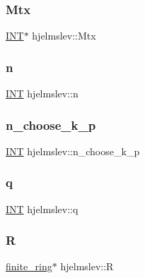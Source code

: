 \mbox{\label{classhjelmslev_aedb29614299b669317b9cb79ea6eaf1f}} 
\subsubsection{\texorpdfstring{Mtx}{Mtx}}
{\footnotesize\ttfamily \mbox{\hyperlink{galois_8h_a09fddde158a3a20bd2dcadb609de11dc}{I\+NT}}$\ast$ hjelmslev\+::\+Mtx}

\mbox{\label{classhjelmslev_a585f34e9f542a79e21b9feaa45146489}} 
\subsubsection{\texorpdfstring{n}{n}}
{\footnotesize\ttfamily \mbox{\hyperlink{galois_8h_a09fddde158a3a20bd2dcadb609de11dc}{I\+NT}} hjelmslev\+::n}

\mbox{\label{classhjelmslev_adcab825e378f663c976860996ca3ca8b}} 
\subsubsection{\texorpdfstring{n\+\_\+choose\+\_\+k\+\_\+p}{n\_choose\_k\_p}}
{\footnotesize\ttfamily \mbox{\hyperlink{galois_8h_a09fddde158a3a20bd2dcadb609de11dc}{I\+NT}} hjelmslev\+::n\+\_\+choose\+\_\+k\+\_\+p}

\mbox{\label{classhjelmslev_a15076d5718e759582ffaeeff417c4ca1}} 
\subsubsection{\texorpdfstring{q}{q}}
{\footnotesize\ttfamily \mbox{\hyperlink{galois_8h_a09fddde158a3a20bd2dcadb609de11dc}{I\+NT}} hjelmslev\+::q}

\mbox{\label{classhjelmslev_aba7f1127861217a1767e3f0c60e8997d}} 
\subsubsection{\texorpdfstring{R}{R}}
{\footnotesize\ttfamily \mbox{\hyperlink{classfinite__ring}{finite\+\_\+ring}}$\ast$ hjelmslev\+::R}

